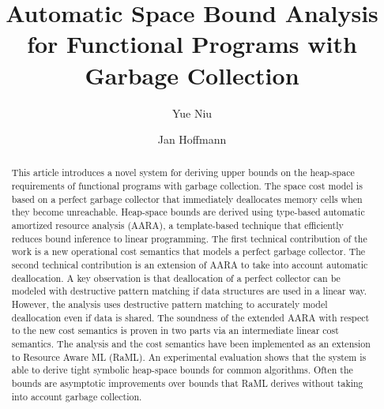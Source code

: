 \documentclass{easychair}
\title{Automatic Space Bound Analysis for Functional Programs with Garbage Collection}
\author{
Yue Niu
\and
Jan Hoffmann
}
\institute{
  Carnegie Mellon University,
  Pittsburgh, PA, United States\\
  \email{\{yuen,jhoffmann\}@cs.cmu.edu}
 }
\theoremstyle{definition}
\begin{document}
\maketitle

\begin{abstract}
  This article introduces a novel system for deriving upper bounds on
  the heap-space requirements of functional programs with garbage
  collection.
  The space cost model is based on a perfect garbage collector that
  immediately deallocates memory cells when they become unreachable.
  Heap-space bounds are derived using type-based automatic amortized
  resource analysis (AARA), a template-based technique that
  efficiently reduces bound inference to linear programming.
	The first technical contribution of the work is a new operational cost
  semantics that models a perfect garbage collector.
  The second technical contribution is an extension of AARA
  to take into account automatic deallocation. A key observation is
  that deallocation of a perfect collector can be modeled with
  destructive pattern matching if data structures are used in a linear
  way. However, the analysis uses destructive pattern matching to
  accurately model deallocation even if data is shared.
  The soundness of the extended AARA with respect to the new cost semantics 
	is proven in two parts via an intermediate linear cost semantics.
  The analysis and the cost semantics have been implemented as an
  extension to Resource Aware ML (RaML). An experimental evaluation
  shows that the system is able to derive tight symbolic heap-space
  bounds for common algorithms. Often the bounds are asymptotic
  improvements over bounds that RaML derives without taking into
  account garbage collection.
\end{abstract}


\iffalse
\setcounter{tocdepth}{3}
{\small
\tableofcontents}
\fi

%
%

\end{document}
